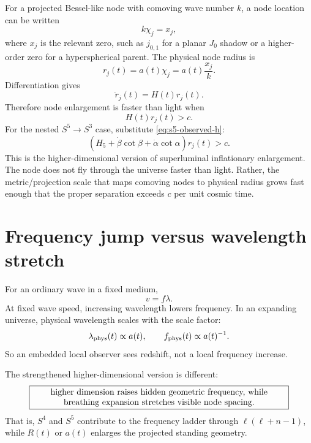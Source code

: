 \documentclass[11pt]{article}
\begin{document}
For a projected Bessel-like node with comoving wave number $k$, a node location can be written
\begin{equation}
 k\chi_j=x_j,
\end{equation}
where $x_j$ is the relevant zero, such as $j_{0,1}$ for a planar $J_0$ shadow or a higher-order zero for a hyperspherical parent.  The physical node radius is
\begin{equation}
 r_j(t)=a(t)\chi_j=a(t)\frac{x_j}{k}.
\end{equation}
Differentiation gives
\begin{equation}
 \dot r_j(t)=H(t)r_j(t).
\end{equation}
Therefore node enlargement is faster than light when
\begin{equation}
 \boxed{H(t)r_j(t)>c.}
 \label{eq:node-superluminal-condition}
\end{equation}
For the nested $S^5\rightarrow S^3$ case, substitute \eqref{eq:s5-observed-h}:
\begin{equation}
 \boxed{
 \left(H_5+\dot\beta\cot\beta+\dot\alpha\cot\alpha\right)r_j(t)>c.
 }
 \label{eq:nested-node-superluminal}
\end{equation}
This is the higher-dimensional version of superluminal inflationary enlargement.  The node does not fly through the universe faster than light.  Rather, the metric/projection scale that maps comoving nodes to physical radius grows fast enough that the proper separation exceeds $c$ per unit cosmic time.

\section{Frequency jump versus wavelength stretch}

For an ordinary wave in a fixed medium,
\begin{equation}
 v=f\lambda.
\end{equation}
At fixed wave speed, increasing wavelength lowers frequency.  In an expanding universe, physical wavelength scales with the scale factor:
\begin{equation}
 \lambda_{\rm phys}(t)\propto a(t),
 \qquad
 f_{\rm phys}(t)\propto a(t)^{-1}.
\end{equation}
So an embedded local observer sees redshift, not a local frequency increase.

The strengthened higher-dimensional version is different:
\begin{equation}
\boxed{\parbox{0.86\textwidth}{\centering higher dimension raises hidden geometric frequency, while breathing expansion stretches visible node spacing.}}
\end{equation}
That is, $S^4$ and $S^5$ contribute to the frequency ladder through $\ell(\ell+n-1)$, while $R(t)$ or $a(t)$ enlarges the projected standing geometry.
\end{document}
